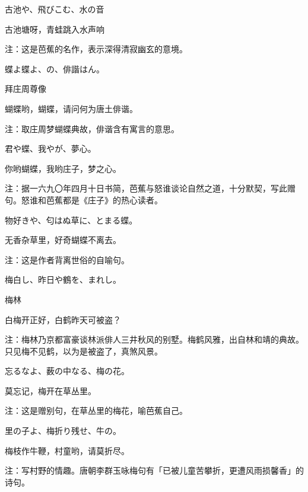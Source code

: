 \begin{haiku}
    {\FH 古池や、飛びこむ、水の音}

    {\FK 古池塘呀，青蛙跳入水声响}

    {\FT 注：这是芭蕉的名作，表示深得清寂幽玄的意境。}
\end{haiku}

\begin{haiku}
    {\FH 蝶よ蝶よ、の、俳諧はん。}

    {\FK 拜庄周尊像}

    {\FK 蝴蝶哟，蝴蝶，请问何为唐土俳谐。}

    {\FT 注：取庄周梦蝴蝶典故，俳谐含有寓言的意思。}
\end{haiku}

\begin{haiku}
    {\FH 君や蝶、我やが、夢心。}

    {\FK 你哟蝴蝶，我哟庄子，梦之心。}

    {\FT 注：据一六九〇年四月十日书简，芭蕉与怒谁谈论自然之道，十分默契，写此赠句。怒谁和芭蕉都是《庄子》的热心读者。}
\end{haiku}

\begin{haiku}
    {\FH 物好きや、匂はぬ草に、とまる蝶。}

    {\FK 无香杂草里，好奇蝴蝶不离去。}

    {\FT 注：这是作者背离世俗的自喻句。}
\end{haiku}

\begin{haiku}
    {\FH 梅白し、昨日や鶴を、まれし。}

    {\FK 梅林}

    {\FK 白梅开正好，白鹤昨天可被盗？}

    {\FT 注：梅林乃京都富豪谈林派俳人三井秋风的别墅。梅鹤风雅，出自林和靖的典故。只见梅不见鹤，以为是被盗了，真煞风景。}
\end{haiku}

\begin{haiku}
    {\FH 忘るなよ、薮の中なる、梅の花。}

    {\FK 莫忘记，梅开在草丛里。}

    {\FT 注：这是赠别句，在草丛里的梅花，喻芭蕉自己。}
\end{haiku}

\begin{haiku}
    {\FH 里の子よ、梅折り残せ、牛の。}

    {\FK 梅枝作牛鞭，村童哟，请莫折尽。}

    {\FT 注：写村野的情趣。唐朝李群玉咏梅句有「已被儿童苦攀折，更遭风雨损馨香」的诗句。}
\end{haiku}

